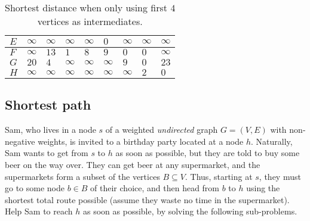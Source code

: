 \begin{solution}
\begin{table}[H]
\begin{tabular}{|l|l|l|l|l|l|l|l|l|}
$E$    & $\infty$ & $\infty$ & $\infty$ & $\infty$ & $0$ & $\infty$ & $\infty$ & $\infty$ \\ \hline
$F$    & $\infty$ & $13$ & $1$ & $8$ & $9$ & $0$ & $0$ & $\infty$ \\ \hline
$G$    & $20$ & $4$ & $\infty$ & $\infty$ & $\infty$ & $9$ & $0$ & $23$ \\ \hline
$H$    & $\infty$ & $\infty$ & $\infty$ & $\infty$ & $\infty$ & $\infty$ & $2$ & $0$ \\ \hline
\end{tabular}
\caption{Shortest distance when only using first $4$ vertices as intermediates.}
\end{table}
\end{solution}
\newpage
\subsection{Shortest path}
\label{question:birthdayparty}
Sam, who lives in a node $s$ of a weighted \emph{undirected} graph $G = (V, E)$ with non-negative weights, is invited to a birthday party located at a node $h$. Naturally, Sam wants to get from $s$ to $h$ as soon as possible, but they are told to buy some beer on the way over. They can get beer at any supermarket, and the supermarkets form a subset of the vertices $B \subseteq V$. Thus, starting at $s$, they must go to some node $b \in B$ of their choice, and then head from $b$ to $h$ using the shortest total route possible (assume they waste no time in the supermarket). Help Sam to reach $h$ as soon as possible, by solving the following sub-problems. 

